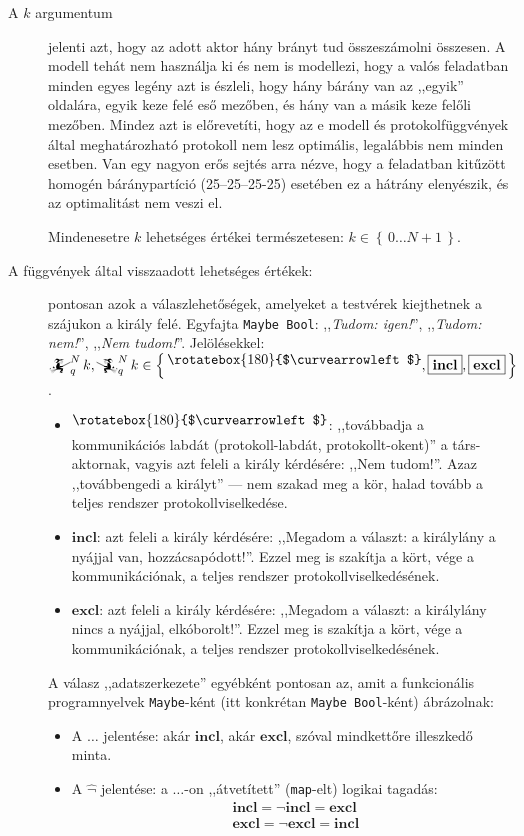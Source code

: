 \documentclass{article}
\newcommand{\nothing}{\text{\raisebox{0.4em}{\rotatebox{180}{$\curvearrowleft$}}}}%
\newcommand{\just}[1]{\boxed{#1}}%
\newcommand{\incl}{\mathbf{incl}}
\newcommand{\excl}{\mathbf{excl}}
\newcommand{\setOf}[1]{\left\lbrace\,#1\,\right\rbrace}
\newcommand{\mainfunA}[3]{\mathwitch_{#2}^{#1}#3}
\newcommand{\mainfunB}[3]{\reversemathwitch_{#2}^{#1}#3}
\begin{document}
\begin{description}
		\item[A $k$ argumentum] jelenti azt, hogy az adott aktor hány brányt tud összeszámolni összesen.
		A modell tehát nem használja ki és nem is modellezi, hogy a valós feladatban minden egyes legény azt is észleli, hogy hány bárány van az ,,egyik'' oldalára, egyik keze felé eső mezőben, és hány van a másik keze felőli mezőben. Mindez azt is előrevetíti, hogy az e modell és protokolfüggvények által meghatározható protokoll nem lesz optimális, legalábbis nem minden esetben. Van egy nagyon erős sejtés arra nézve, hogy a feladatban kitűzött homogén báránypartíció (25--25--25-25) esetében ez a hátrány elenyészik, és az optimalitást nem veszi el.

		Mindenesetre $k$ lehetséges értékei természetesen: $k\in\setOf{0\dots N+1}$.

		\item[A függvények által visszaadott lehetséges értékek:] pontosan azok a válaszlehetőségek, amelyeket a testvérek kiejthetnek a szájukon a király felé. Egyfajta \texttt{Maybe Bool}: ,,\textit{Tudom: igen!}'', ,,\textit{Tudom: nem!}'', ,,\textit{Nem tudom!}''. Jelölésekkel: $\mainfunA Nqk, \mainfunB Nqk \in \setOf{\nothing, \just\incl, \just\excl}$.
		\begin{itemize}
			\item $\nothing$: ,,továbbadja a kommunikációs labdát (protokoll-labdát, protokollt-okent)'' a társ-aktornak, vagyis azt feleli a király kérdésére: ,,Nem tudom!''.  Azaz ,,továbbengedi a királyt'' --- nem szakad meg a kör, halad tovább a teljes rendszer protokollviselkedése.
			\item $\just\incl$: azt feleli a király kérdésére: ,,Megadom a választ:  a királylány a nyájjal van, hozzácsapódott!''. Ezzel meg is szakítja a kört, vége a kommunikációnak, a teljes rendszer protokollviselkedésének.
			\item $\just\excl$: azt feleli a király kérdésére: ,,Megadom a választ:  a királylány nincs a nyájjal, elkóborolt!''. Ezzel meg is szakítja a kört, vége a kommunikációnak, a teljes rendszer protokollviselkedésének.
		\end{itemize}
		A válasz ,,adatszerkezete'' egyébként pontosan az, amit a funkcionális programnyelvek \texttt{Maybe}-ként (itt konkrétan \texttt{Maybe Bool}-ként) ábrázolnak:
		\begin{itemize}
			\item A $\just{\dots}$ jelentése: akár $\just\incl$, akár $\just\excl$, szóval mindkettőre illeszkedő minta.
			\item A $\hat\lnot$ jelentése: a $\just\dots$-on ,,átvetített'' (\texttt{map}-elt) logikai tagadás:
			\begin{align*}
				\mathop{\hat\lnot}\just\incl = \just{\lnot\incl} = \just\excl\\
				\mathop{\hat\lnot}\just\excl = \just{\lnot\excl} = \just\incl
			\end{align*}
		\end{itemize}
	\end{description} 
	
\end{document}
